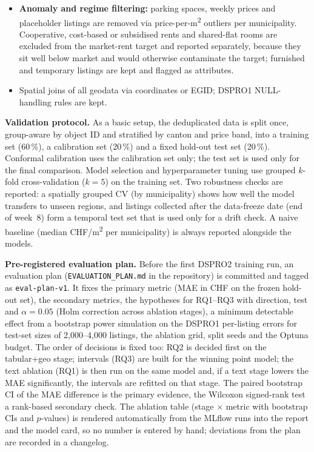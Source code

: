 \documentclass[11pt,a4paper]{article}
\begin{document}
\begin{itemize}
    \item \textbf{Anomaly and regime filtering:} parking spaces, weekly prices and placeholder listings are removed via price-per-m\textsuperscript{2} outliers per municipality. Cooperative, cost-based or subsidised rents and shared-flat rooms are excluded from the market-rent target and reported separately, because they sit well below market and would otherwise contaminate the target; furnished and temporary listings are kept and flagged as attributes.
    \item Spatial joins of all geodata via coordinates or EGID; DSPRO1 NULL-handling rules are kept.
\end{itemize}

\textbf{Validation protocol.} As a basic setup, the deduplicated data is split once, group-aware by object ID and stratified by canton and price band, into a training set (60\,\%), a calibration set (20\,\%) and a fixed hold-out test set (20\,\%). Conformal calibration uses the calibration set only; the test set is used only for the final comparison. Model selection and hyperparameter tuning use grouped $k$-fold cross-validation ($k=5$) on the training set. Two robustness checks are reported: a spatially grouped CV (by municipality) shows how well the model transfers to unseen regions, and listings collected after the data-freeze date (end of week~8) form a temporal test set that is used only for a drift check. A naive baseline (median CHF/m\textsuperscript{2} per municipality) is always reported alongside the models.

\textbf{Pre-registered evaluation plan.} Before the first DSPRO2 training run, an evaluation plan (\texttt{EVALUATION\_PLAN.md} in the repository) is committed and tagged as \texttt{eval-plan-v1}. It fixes the primary metric (MAE in CHF on the frozen hold-out set), the secondary metrics, the hypotheses for RQ1--RQ3 with direction, test and $\alpha = 0.05$ (Holm correction across ablation stages), a minimum detectable effect from a bootstrap power simulation on the DSPRO1 per-listing errors for test-set sizes of 2{,}000--4{,}000 listings, the ablation grid, split seeds and the Optuna budget. The order of decisions is fixed too: RQ2 is decided first on the tabular+geo stage; intervals (RQ3) are built for the winning point model; the text ablation (RQ1) is then run on the same model and, if a text stage lowers the MAE significantly, the intervals are refitted on that stage. The paired bootstrap CI of the MAE difference is the primary evidence, the Wilcoxon signed-rank test a rank-based secondary check. The ablation table (stage $\times$ metric with bootstrap CIs and $p$-values) is rendered automatically from the MLflow runs into the report and the model card, so no number is entered by hand; deviations from the plan are recorded in a changelog.
\end{document}
